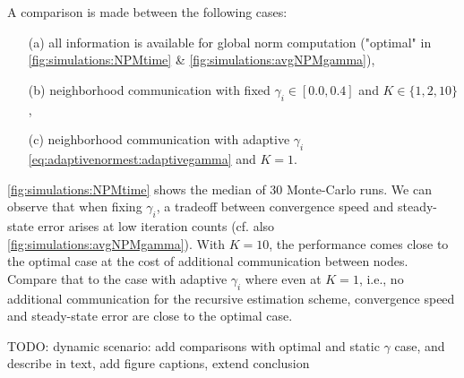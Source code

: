 \documentclass{article}
\begin{document}
A comparison is made between the following cases:
\begin{itemize}
    \itemsep-0.2em
    \item[(a)] all information is available for global norm computation ("optimal" in \autoref{fig:simulations:NPMtime} \& \autoref{fig:simulations:avgNPMgamma}),
    \item[(b)] neighborhood communication with fixed \(\gamma_i \in [0.0, 0.4]\) and \(K \in \{1,2,10\}\),
    \item[(c)] neighborhood communication with adaptive \(\gamma_i\) \eqref{eq:adaptivenormest:adaptivegamma} and \(K=1\).
\end{itemize}
\autoref{fig:simulations:NPMtime} shows the median of 30 Monte-Carlo runs.
We can observe that when fixing \(\gamma_i\), a tradeoff between convergence speed and steady-state error arises at low iteration counts (cf. also \autoref{fig:simulations:avgNPMgamma}).
With \(K=10\), the performance comes close to the optimal case at the cost of additional communication between nodes.
Compare that to the case with adaptive \(\gamma_i\) where even at \(K=1\), i.e., no additional communication for the recursive estimation scheme, convergence speed and steady-state error are close to the optimal case.

\begin{todo}
    TODO: dynamic scenario: add comparisons with optimal and static \(\gamma\) case, and describe in text, add figure captions, extend conclusion
\end{todo}

%     
%     
%     

\begin{figure}[t]
    \centering
    \\\vspace*{-1.0cm}
    \\\vspace*{-1.0cm}
    
    \caption[]{}
    \label{fig:simulations:NPMtimedyn}
\end{figure}
\end{document}
